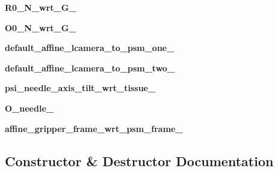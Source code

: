 \begin{DoxyCompactItemize}
\item 
{\bfseries R0\+\_\+\+N\+\_\+wrt\+\_\+\+G\+\_\+}\hypertarget{classneedle__planner_1_1needle__planner_ad54e8f26556d4b4f4af21cb945dd0931}{}\label{classneedle__planner_1_1needle__planner_ad54e8f26556d4b4f4af21cb945dd0931}

\item 
{\bfseries O0\+\_\+\+N\+\_\+wrt\+\_\+\+G\+\_\+}\hypertarget{classneedle__planner_1_1needle__planner_a55ec2083ce3d21dca5877ea6d7838842}{}\label{classneedle__planner_1_1needle__planner_a55ec2083ce3d21dca5877ea6d7838842}

\item 
{\bfseries default\+\_\+affine\+\_\+lcamera\+\_\+to\+\_\+psm\+\_\+one\+\_\+}\hypertarget{classneedle__planner_1_1needle__planner_aa1338db2cf2b223bfa242c588a760746}{}\label{classneedle__planner_1_1needle__planner_aa1338db2cf2b223bfa242c588a760746}

\item 
{\bfseries default\+\_\+affine\+\_\+lcamera\+\_\+to\+\_\+psm\+\_\+two\+\_\+}\hypertarget{classneedle__planner_1_1needle__planner_aa7d226db6395839efcd5424e73760708}{}\label{classneedle__planner_1_1needle__planner_aa7d226db6395839efcd5424e73760708}

\item 
{\bfseries psi\+\_\+needle\+\_\+axis\+\_\+tilt\+\_\+wrt\+\_\+tissue\+\_\+}\hypertarget{classneedle__planner_1_1needle__planner_a14f5c2032a379add202986914e3669a3}{}\label{classneedle__planner_1_1needle__planner_a14f5c2032a379add202986914e3669a3}

\item 
{\bfseries O\+\_\+needle\+\_\+}\hypertarget{classneedle__planner_1_1needle__planner_a679689e8e248bac060f5ff92c41da26e}{}\label{classneedle__planner_1_1needle__planner_a679689e8e248bac060f5ff92c41da26e}

\item 
{\bfseries affine\+\_\+gripper\+\_\+frame\+\_\+wrt\+\_\+psm\+\_\+frame\+\_\+}\hypertarget{classneedle__planner_1_1needle__planner_ae3de88902ceb505cd2a971f117215af6}{}\label{classneedle__planner_1_1needle__planner_ae3de88902ceb505cd2a971f117215af6}

\end{DoxyCompactItemize}


\subsection{Constructor \& Destructor Documentation}
